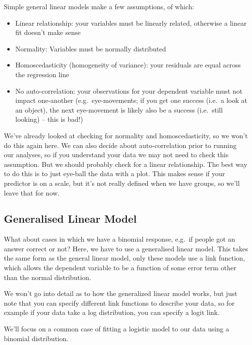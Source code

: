 \documentclass[
]{book}
\providecommand{\tightlist}{%
  \setlength{\itemsep}{0pt}\setlength{\parskip}{0pt}}
\begin{document}
Simple general linear models make a few assumptions, of which:

\begin{itemize}
\tightlist
\item
  Linear relationship: your variables must be linearly related, otherwise a linear fit doesn't make sense
\item
  Normality: Variables must be normally distributed
\item
  Homoscedasticity (homogeneity of variance): your residuals are equal across the regression line
\item
  No auto-correlation: your observations for your dependent variable must not impact one-another (e.g.~eye-movements; if you get one success (i.e.~a look at an object), the next eye-movement is likely also be a success (i.e.~still looking) -- this is bad!)
\end{itemize}

We've already looked at checking for normality and homoscedasticity, so we won't do this again here. We can also decide about auto-correlation prior to running our analyses, so if you understand your data we may not need to check this assumption. But we should probably check for a linear relationship. The best way to do this is to just eye-ball the data with a plot. This makes sense if your predictor is on a scale, but it's not really defined when we have groups, so we'll leave that for now.

\hypertarget{generalised-linear-model}{%
\subsection{Generalised Linear Model}\label{generalised-linear-model}}

What about cases in which we have a binomial response, e.g.~if people got an answer correct or not? Here, we have to use a generalised linear model. This takes the same form as the general linear model, only these models use a link function, which allows the dependent variable to be a function of some error term other than the normal distribution.

We won't go into detail as to how the generalized linear model works, but just note that you can specify different link functions to describe your data, so for example if your data take a log distribution, you can specify a logit link.

We'll focus on a common case of fitting a logistic model to our data using a binomial distribution.
\end{document}
